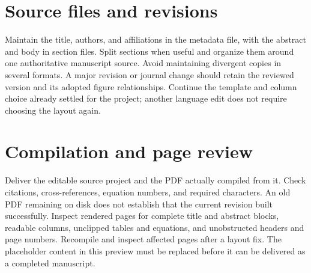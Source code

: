 \section{Source files and revisions}
Maintain the title, authors, and affiliations in the metadata file, with the
abstract and body in section files. Split sections when useful and organize
them around one authoritative manuscript source. Avoid maintaining divergent
copies in several formats. A major revision or journal change should retain
the reviewed version and its adopted figure relationships. Continue the
template and column choice already settled for the project; another language
edit does not require choosing the layout again.

\section{Compilation and page review}
Deliver the editable source project and the PDF actually compiled from it.
Check citations, cross-references, equation numbers, and required characters.
An old PDF remaining on disk does not establish that the current revision
built successfully. Inspect rendered pages for complete title and abstract
blocks, readable columns, unclipped tables and equations, and unobstructed
headers and page numbers. Recompile and inspect affected pages after a layout
fix. The placeholder content in this preview must be replaced before it can
be delivered as a completed manuscript.
\fi
